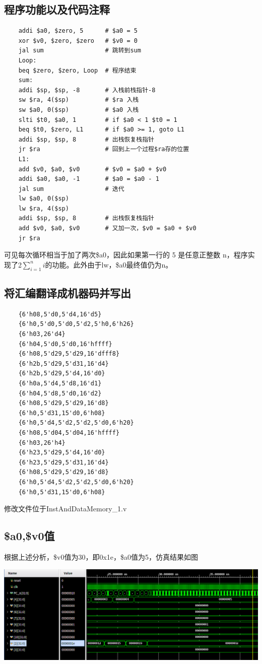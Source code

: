 \documentclass{article}
\begin{document}
\subsection{程序功能以及代码注释}
\begin{lstlisting}
    addi $a0, $zero, 5      # $a0 = 5
    xor $v0, $zero, $zero   # $v0 = 0
    jal sum                 # 跳转到sum
    Loop:
    beq $zero, $zero, Loop  # 程序结束
    sum:
    addi $sp, $sp, -8       # 入栈前栈指针-8
    sw $ra, 4($sp)          # $ra 入栈
    sw $a0, 0($sp)          # $a0 入栈
    slti $t0, $a0, 1        # if $a0 < 1 $t0 = 1
    beq $t0, $zero, L1      # if $a0 >= 1, goto L1
    addi $sp, $sp, 8        # 出栈恢复栈指针
    jr $ra                  # 回到上一个过程$ra存的位置
    L1:
    add $v0, $a0, $v0       # $v0 = $a0 + $v0
    addi $a0, $a0, -1       # $a0 = $a0 - 1
    jal sum                 # 迭代
    lw $a0, 0($sp)          
    lw $ra, 4($sp)
    addi $sp, $sp, 8        # 出栈恢复栈指针
    add $v0, $a0, $v0       # 又加一次，$v0 = $a0 + $v0
    jr $ra
\end{lstlisting}
可见每次循环相当于加了两次\$a0，因此如果第一行的 5 是任意正整数 n，程序实现了2$\sum_{i=1}^ni$的功能。此外由于lw，\$a0最终值仍为n。
\subsection{将汇编翻译成机器码并写出}
\begin{lstlisting}
    {6'h08,5'd0,5'd4,16'd5}
    {6'h0,5'd0,5'd0,5'd2,5'h0,6'h26}
    {6'h03,26'd4}
    {6'h04,5'd0,5'd0,16'hffff}
    {6'h08,5'd29,5'd29,16'dfff8}
    {6'h2b,5'd29,5'd31,16'd4}
    {6'h2b,5'd29,5'd4,16'd0}
    {6'h0a,5'd4,5'd8,16'd1}
    {6'h04,5'd8,5'd0,16'd2}
    {6'h08,5'd29,5'd29,16'd8}
    {6'h0,5'd31,15'd0,6'h08}
    {6'h0,5'd4,5'd2,5'd2,5'd0,6'h20}
    {6'h08,5'd04,5'd04,16'hffff}
    {6'h03,26'h4}
    {6'h23,5'd29,5'd4,16'd0}
    {6'h23,5'd29,5'd31,16'd4}
    {6'h08,5'd29,5'd29,16'd8}
    {6'h0,5'd4,5'd2,5'd2,5'd0,6'h20}
    {6'h0,5'd31,15'd0,6'h08}
\end{lstlisting}
修改文件位于InstAndDataMemory\_1.v
\subsection{\$a0,\$v0值}
根据上述分析，\$v0值为30，即0x1e，\$a0值为5，仿真结果如图
\begin{center}
    \includegraphics[width = 16cm]{images/sim_2_waveform.png}
\end{center}
\end{document}
